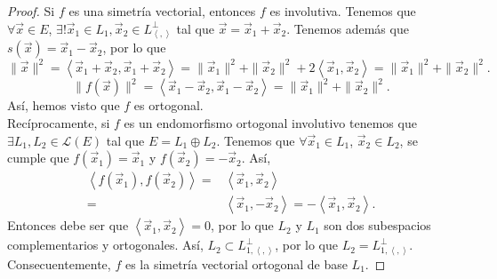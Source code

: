 \begin{proof}
Si $\displaystyle f $ es una simetría vectorial, entonces $\displaystyle f $ es involutiva. Tenemos que $\displaystyle \forall \vec{x} \in E $, $\displaystyle \exists!\vec{x}_{1} \in L_{1}, \vec{x}_{2} \in L^{\perp }_{\left\langle ,  \right\rangle } $ tal que $\displaystyle \vec{x} = \vec{x}_{1} + \vec{x}_{2} $. Tenemos además que $\displaystyle s\left(\vec{x}\right) = \vec{x}_{1}-\vec{x}_{2} $, por lo que
\[ \|\vec{x}\|^{2} = \left\langle \vec{x}_{1}+\vec{x}_{2}, \vec{x}_{1} +\vec{x}_{2} \right\rangle  = \|\vec{x}_{1} \|^{2} + \|\vec{x}_{2}\|^{2} + 2\left\langle \vec{x}_{1}, \vec{x}_{2} \right\rangle = \|\vec{x}_{1}\|^{2} + \|\vec{x}_{2}\|^{2} .\]
\[\|f\left(\vec{x}\right)\|^{2} = \left\langle \vec{x}_{1}-\vec{x}_{2}, \vec{x}_{1}-\vec{x}_{2} \right\rangle = \|\vec{x}_{1}\|^{2} + \|\vec{x}_{2}\|^{2} .\]
Así, hemos visto que $\displaystyle f $ es ortogonal. \\ 
Recíprocamente, si $\displaystyle f $ es un endomorfismo ortogonal involutivo tenemos que $\displaystyle \exists L_{1}, L_{2} \in \mathcal{L}\left(E\right) $ tal que $\displaystyle E = L_{1} \oplus L_{2} $. Tenemos que $\displaystyle \forall\vec{x}_{1} \in L_{1} $, $\displaystyle \vec{x}_{2} \in L_{2} $, se cumple que $\displaystyle f\left(\vec{x}_{1}\right) = \vec{x}_{1} $ y $\displaystyle f\left(\vec{x}_{2}\right) = - \vec{x}_{2} $. Así, 
\[
\begin{split}
	\left\langle f\left(\vec{x}_{1}\right), f\left(\vec{x}_{2}\right) \right\rangle =& \left\langle \vec{x}_{1}, \vec{x}_{2} \right\rangle \\
= &\left\langle \vec{x}_{1}, -\vec{x}_{2} \right\rangle = - \left\langle \vec{x}_{1}, \vec{x}_{2} \right\rangle .
\end{split}
\]
Entonces debe ser que $\displaystyle \left\langle \vec{x}_{1}, \vec{x}_{2} \right\rangle =0 $, por lo que $\displaystyle L_{2} $ y $\displaystyle L_{1} $ son dos subespacios complementarios y ortogonales. Así, $\displaystyle L_{2} \subset L^{\perp }_{1,\left\langle ,  \right\rangle } $, por lo que $\displaystyle L_{2} = L_{1, \left\langle ,  \right\rangle }^{\perp} $. Consecuentemente, $\displaystyle f $ es la simetría vectorial ortogonal de base $\displaystyle L_{1} $. 
\end{proof}
